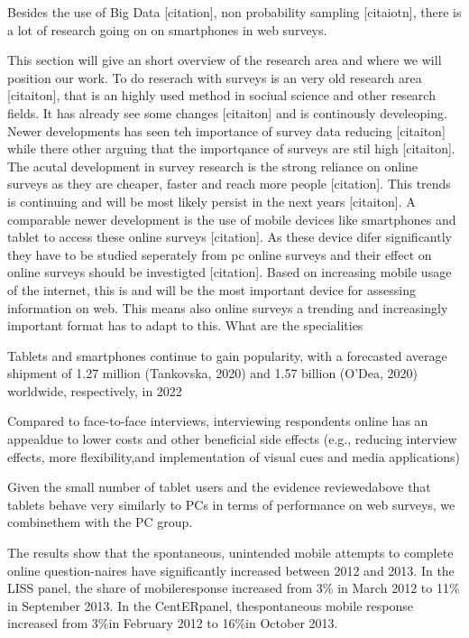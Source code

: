 
Besides the use of Big Data [citation], non probability sampling [citaiotn], there is a lot of research going on on smartphones in web surveys.\cite{couper_is_2013}

This section will give an short overview of the research area and where we will position our work. To do reserach with surveys is an very old research area [citaiton], that is an highly used method in sociual science and other research fields. It has already see some changes [citaiton] and is continously develeoping. Newer developments has seen teh importance of survey data reducing [citaiton] while there other arguing that the importqance of surveys are stil high [citaiton]. The acutal development in survey research  is the strong reliance on online surveys as they are cheaper, faster and reach more people [citation]. This trends is continuing and will be most likely persist in the next years [citaiton]. A comparable newer development is the use of mobile devices like smartphones and tablet to access these online surveys [citation]. As these device difer significantly they have to be studied seperately from pc online surveys and their effect on online surveys should be investigted [citation].
Based on increasing mobile usage of the internet, this is and will be the most important device for assessing information on web. This means also online surveys a trending and increasingly important format has to adapt to this. What are the specialities

Tablets and smartphones continue to gain popularity, with a forecasted average shipment of 1.27 million (Tankovska, 2020) and 1.57 billion (O’Dea, 2020) worldwide, respectively, in 2022 \cite{weigold_computerized_2021}

Compared to face-to-face interviews, interviewing respondents online has an appealdue to lower costs and other beneficial side effects (e.g., reducing interview effects, more flexibility,and implementation of visual cues and media applications) \cite{gummer_does_2019}

Given the small number of tablet users and the evidence reviewedabove that tablets behave very similarly to PCs in terms of performance on web surveys, we combinethem with the PC group. \cite{couper_why_2017}

The results show that the spontaneous, unintended mobile attempts to complete online question-naires have significantly increased between 2012 and 2013. In the LISS panel, the share of mobileresponse increased from 3\% in March 2012 to 11\% in September 2013. In the CentERpanel, thespontaneous mobile response increased from 3\%in February 2012 to 16\%in October 2013. \cite{de_bruijne_mobile_2014}


